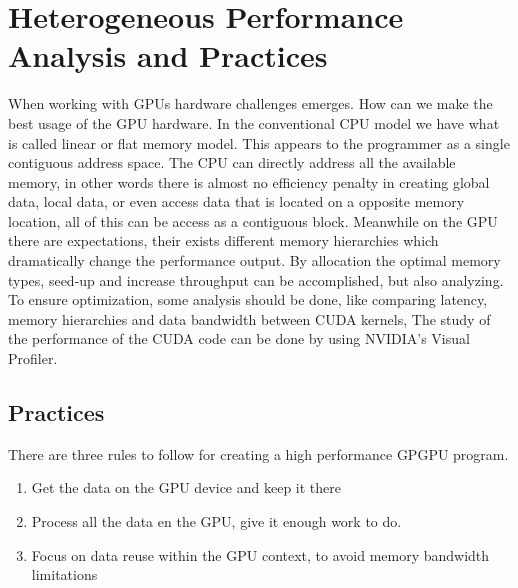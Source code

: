 
\chapter{Heterogeneous Performance Analysis and Practices} %

\label{Heterogeneous Performance Analysis and Practices} %



When working with GPUs hardware challenges emerges. How can we make the best usage of the GPU hardware. In the conventional CPU model we have what is called linear or flat memory model. This appears to the programmer as a single contiguous address space. The CPU can directly address all the available memory, in other words there is almost no efficiency penalty in creating global data, local data, or even access data that is located on a opposite memory location, all of this can be access as a contiguous block. \cite{cook} Meanwhile on the GPU there are expectations, their exists different memory hierarchies which dramatically change the performance output. By allocation the optimal memory types, seed-up and increase throughput can be accomplished, but also analyzing. To ensure optimization, some analysis should be done, like comparing latency, memory hierarchies and data bandwidth between CUDA kernels, The study of the performance of the CUDA code can be done by using NVIDIA's Visual Profiler.


\section{Practices}


There are three rules to follow for creating a high performance GPGPU program.\cite{design}

\begin{enumerate}
  \item Get the data on the GPU device and keep it there
  \item Process all the data en the GPU, give it enough work to do.
  \item Focus on data reuse within the GPU context, to avoid memory bandwidth limitations
\end{enumerate}

